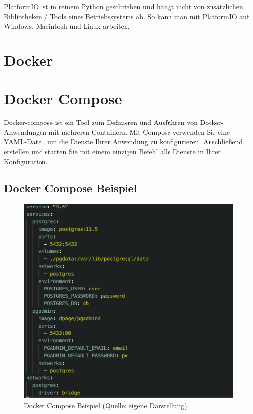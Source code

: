 PlatformIO ist in reinem Python geschrieben und hängt nicht von zusätzlichen Bibliotheken / Tools eines Betriebssystems ab. So kann man mit PlatformIO auf Windows, Macintosh und Linux arbeiten.

\section{Docker}\label{sec:docker}



\section{Docker Compose}\label{sec:docker-compose}

Docker-compose ist ein Tool zum Definieren und Ausführen von Docker-Anwendungen mit mehreren Containern. Mit Compose verwenden Sie eine YAML-Datei, um die Dienste Ihrer Anwendung zu konfigurieren. Anschließend erstellen und starten Sie mit einem einzigen Befehl alle Dienste in Ihrer Konfiguration. \cite{docker_compose_description}

\subsection{Docker Compose Beispiel}

\begin{figure}[H]
    \begin{center}
        \includegraphics[scale=0.8]{images/docker_compose_example.png}
        \caption{Docker Compose Beispiel (Quelle: eigene Darstellung)}
    \end{center}
\end{figure}

